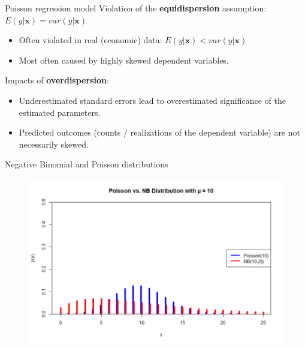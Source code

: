 \documentclass[usenames,dvipsnames]{beamer}
\begin{document}
\begin{frame}{Poisson regression model}
Violation of the \textbf{equidispersion} assumption: {\small $E(y|\bm{x}) = \textit{var} (y|\bm{x})$} \\
\begin{itemize}
\item Often violated in real (economic) data: {\small $E(y|\bm{x}) < \textit{var} (y|\bm{x})$}
\item Most often caused by highly skewed dependent variables. 
\end{itemize}
\bigskip
Impacts of \textbf{overdispersion}:
\begin{itemize}
\item Underestimated standard errors lead to overestimated significance of the estimated parameters.
\item Predicted outcomes (counts / realizations of the dependent variable) are not necessarily skewed.
\end{itemize} 
\end{frame}
\begin{frame}{Negative Binomial and Poisson distributions}
\begin{figure}
\centering
\includegraphics[width=\textwidth]{./img/P11_5}
\end{figure}
\end{frame}
\end{document}
